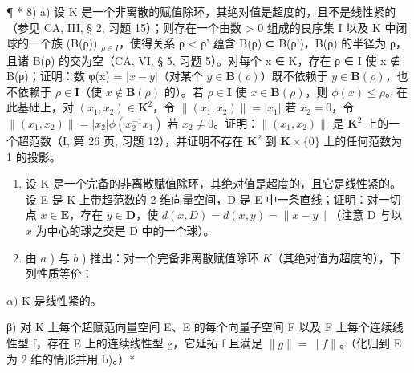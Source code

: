 ¶ * 8) a) 设 K 是一个非离散的赋值除环，其绝对值是超度的，且不是线性紧的（参见 CA, III, § 2, 习题 15）；则存在一个由数 > 0 组成的良序集 I 以及 K 中闭球的一个族 (B(ρ)) \(_{ρ \in I}\)，使得关系 ρ < ρ' 蕴含 B(ρ) ⊂ B(ρ')，B(ρ) 的半径为 ρ，且诸 B(ρ) 的交为空（CA, VI, § 5, 习题 5）。对每个 x ∈ K，存在 ρ ∈ I 使 x ∉ B(ρ)；证明：数 φ(x) = \(|x-y|\)（对某个 \(y \in \mathbf{B}(\rho)\)）既不依赖于 \(y \in \mathbf{B}(\rho)\)，也不依赖于 \(\rho \in \mathbf{I}\)（使 \(x \notin \mathbf{B}(\rho)\) 的）。若 \(\rho \in \mathbf{I}\) 使 \(x \in \mathbf{B}(\rho)\)，则 \(\phi(x) \leqslant \rho\)。在此基础上，对 \((x_1, x_2) \in \mathbf{K}^2\)，令 \(\| (x_1, x_2) \| = |x_1|\) 若 \(x_2 = 0\)，令 \(\| (x_1, x_2) \| = |x_2| \phi(x_2^{-1} x_1)\) 若 \(x_2 \neq 0\)。证明：\(\| (x_1, x_2) \|\) 是 \(\mathbf{K}^2\) 上的一个超范数（I, 第 26 页, 习题 12），并证明不存在 \(\mathbf{K}^2\) 到 \(\mathbf{K} \times \{0\}\) 上的任何范数为 1 的投影。

\begin{enumerate}
\def\labelenumi{\alph{enumi})}
\setcounter{enumi}{1}
\item
  设 K 是一个完备的非离散赋值除环，其绝对值是超度的，且它是线性紧的。设 E 是 K 上带超范数的 2 维向量空间，D 是 E 中一条直线；证明：对一切点 \(x \in \mathbf{E}\)，存在 \(y \in \mathbf{D}\)，使 \(d(x, D) = d(x, y) = \| x - y \|\)（注意 D 与以 \(x\) 为中心的球之交是 D 中的一个球）。
\item
  由 \(a\) ) 与 \(b\) ) 推出：对一个完备非离散赋值除环 \(K\)（其绝对值为超度的），下列性质等价：
\end{enumerate}

\(\alpha)\) K 是线性紧的。

β) 对 K 上每个超赋范向量空间 E、E 的每个向量子空间 F 以及 F 上每个连续线性型 f，存在 E 上的连续线性型 g，它延拓 f 且满足 \(\|g\| = \|f\|\)。（化归到 E 为 2 维的情形并用 b)。）*

